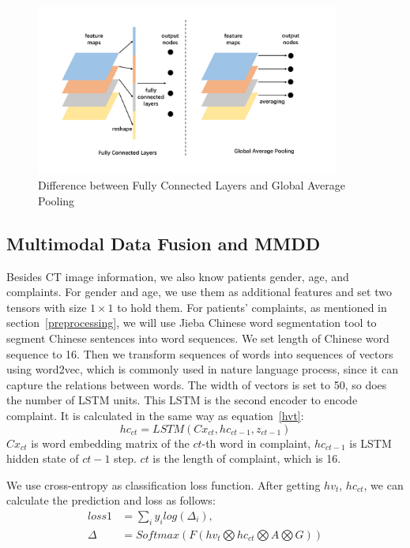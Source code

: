 \documentclass[runningheads]{llncs}
\begin{document}
\begin{figure}[htb]
    \centerline{\includegraphics[width=100mm]{gap.pdf}}
    \vspace{-0cm}
    \caption{Difference between Fully Connected Layers and Global Average Pooling}
    \vspace{-0cm}
    \label{gap}
    \end{figure}


\subsection{Multimodal Data Fusion and MMDD}
\label{MMDD}
Besides CT image information, we also know patients gender, age, and complaints. For gender and age, we use them as additional features and set two tensors with size $1 \times 1$ to hold them. For patients' complaints, as mentioned in section~\ref{preprocessing}, we will use Jieba Chinese word segmentation tool to segment Chinese sentences into word sequences. We set length of Chinese word sequence to 16. Then we transform sequences of words into sequences of vectors using word2vec, which is commonly used in nature language process, since it can capture the relations between words. The width of vectors is set to 50, so does the number of LSTM units. This LSTM is the second encoder to encode complaint. It is calculated in the same way as equation~\ref{hvt}:
\begin{equation}
    hc_{ct} = LSTM(Cx_{ct}, hc_{ct-1}, z_{ct-1})
    \label{hct}
\end{equation}
$Cx_{ct}$ is word embedding matrix of the $ct$-th word in complaint, $hc_{ct-1}$ is LSTM hidden state of $ct-1$ step. $ct$ is the length of complaint, which is 16. 

We use cross-entropy as classification loss function\cite{Zreik2018A}. After getting $hv_t$, $hc_{ct}$, we can calculate the prediction and loss as follows:
\begin{align*}\label{classifyandloss1}
    loss1 &= \sum_i{y_i log(\Delta_i)}, \\
    \Delta &= Softmax(F(hv_t \bigotimes hc_{ct} \bigotimes A \bigotimes G))
\end{align*}
\end{document}
